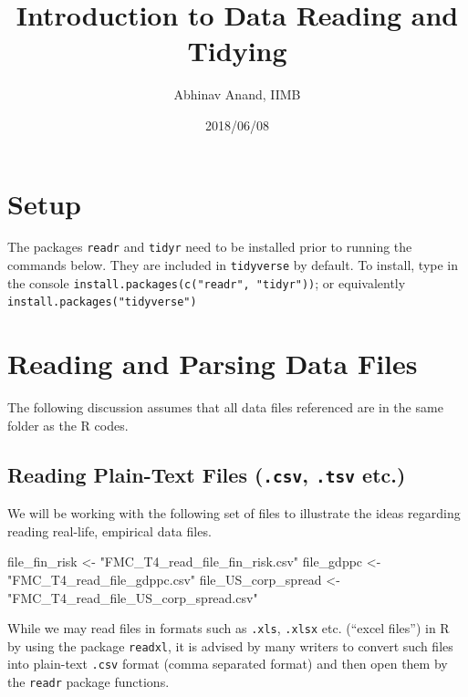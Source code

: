 \documentclass[11pt,]{article}
\title{Introduction to Data Reading and Tidying}
\author{Abhinav Anand, IIMB}
\date{2018/06/08}
\newenvironment{Shaded}{\begin{snugshade}}{\end{snugshade}}
\newcommand{\StringTok}[1]{\textcolor[rgb]{0.31,0.60,0.02}{#1}}
\newcommand{\NormalTok}[1]{#1}
\begin{document}
\maketitle

\section{Setup}\label{setup}

The packages \texttt{readr} and \texttt{tidyr} need to be installed
prior to running the commands below. They are included in
\texttt{tidyverse} by default. To install, type in the console
\texttt{install.packages(c("readr",\ "tidyr"))}; or equivalently
\texttt{install.packages("tidyverse")}

\section{Reading and Parsing Data
Files}\label{reading-and-parsing-data-files}

The following discussion assumes that all data files referenced are in
the same folder as the R codes.

\subsection{\texorpdfstring{Reading Plain-Text Files (\texttt{.csv},
\texttt{.tsv}
etc.)}{Reading Plain-Text Files (.csv, .tsv etc.)}}\label{reading-plain-text-files-.csv-.tsv-etc.}

We will be working with the following set of files to illustrate the
ideas regarding reading real-life, empirical data files.

\begin{Shaded}
\begin{Highlighting}[]
\NormalTok{file_fin_risk <-}\StringTok{ "FMC_T4_read_file_fin_risk.csv"}
\NormalTok{file_gdppc <-}\StringTok{ "FMC_T4_read_file_gdppc.csv"}
\NormalTok{file_US_corp_spread <-}\StringTok{ "FMC_T4_read_file_US_corp_spread.csv"}
\end{Highlighting}
\end{Shaded}

While we may read files in formats such as \texttt{.xls}, \texttt{.xlsx}
etc. (``excel files'') in R by using the package \texttt{readxl}, it is
advised by many writers to convert such files into plain-text
\texttt{.csv} format (comma separated format) and then open them by the
\texttt{readr} package functions.
\end{document}

